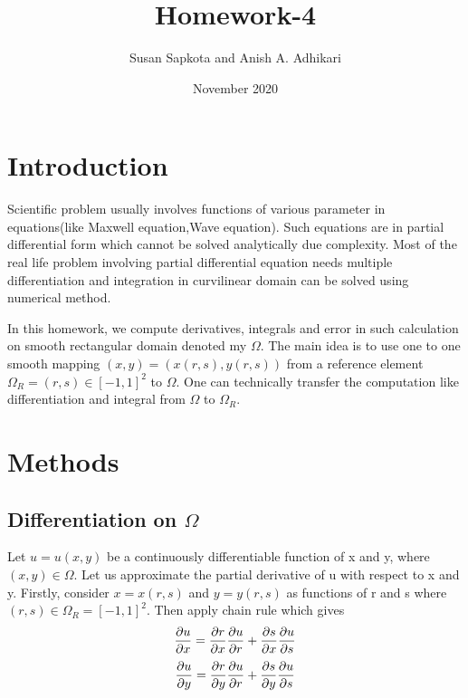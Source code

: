 \documentclass{article}
\title{Homework-4}
\author{Susan Sapkota and Anish A. Adhikari}
\date{November 2020}
\begin{document}
\maketitle
\section{Introduction}
Scientific problem usually involves functions of various parameter in equations(like Maxwell equation,Wave equation). Such equations are in partial differential form which cannot be solved analytically due complexity. Most of the real life problem involving partial differential equation needs multiple differentiation and integration in curvilinear domain can be solved using numerical method.

 In this homework, we compute derivatives, integrals and error in such calculation on smooth rectangular domain denoted my $\Omega$. The main idea is to use one to one smooth mapping $(x,y)=(x(r,s),y(r,s))$ from a reference element $\Omega_R=(r,s)\in [-1,1]^2$ to $\Omega$. One can technically transfer the computation like differentiation and integral from $\Omega$ to $\Omega_R$.
\section{Methods}
\subsection{Differentiation on $\Omega$}
Let $u=u(x,y)$ be a continuously differentiable function of x and y, where $(x,y) \in \Omega$. Let us approximate the partial derivative of u with respect to x and y. Firstly, consider $x=x(r,s)$ and $y=y(r,s)$ as functions of r and s where $(r,s) \in \Omega_R = [-1,1]^2$. Then apply chain rule which gives
\begin{equation}
    \dfrac{\partial u}{\partial x}
        = \dfrac{\partial r}{\partial x} \dfrac{\partial u}{\partial r}
        + \dfrac{\partial s}{\partial x} \dfrac{\partial u}{\partial s} \\[4mm]
\end{equation}
\begin{equation}
    \dfrac{\partial u}{\partial y}
        = \dfrac{\partial r}{\partial y} \dfrac{\partial u}{\partial r}
        + \dfrac{\partial s}{\partial y} \dfrac{\partial u}{\partial s} \\[4mm]
\end{equation}
\end{document}
